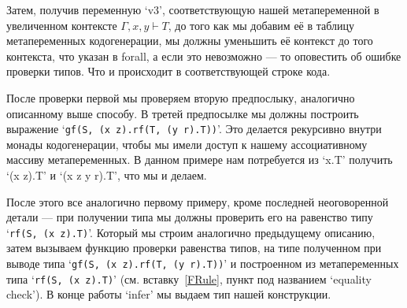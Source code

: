 Затем, получив переменную `v3', соответствующую нашей метапеременной в увеличенном контексте $\Gamma, x, y \vdash T$, до того как мы добавим её в таблицу метапеременных кодогенерации, мы должны уменьшить её контекст до того контекста, что указан в forall, а если это невозможно --- то оповестить об ошибке проверки типов. Что и происходит в соответствующей строке кода.

После проверки первой мы проверяем вторую предпослыку, аналогично описанному выше способу. В третей предпосылке мы должны построить выражение `\lstinline{gf(S, (x z).rf(T, (y r).T))}'. Это делается рекурсивно внутри монады кодогенерации, чтобы мы имели доступ к нашему ассоциативному массиву метапеременных. В данном примере нам потребуется из `x.T' получить `(x z).T' и `(x z y r).T', что мы и делаем.

После этого все аналогично первому примеру, кроме последней неоговоренной детали --- при получении типа мы должны проверить его на равенство типу  `\lstinline{rf(S, (x z).T)}'. Который мы строим аналогично предыдущему описанию, затем вызываем функцию проверки равенства типов, на типе полученном при выводе типа `\lstinline{gf(S, (x z).rf(T, (y r).T))}' и построенном из метапеременных типа `\lstinline{rf(S, (x z).T)}' (см. вставку~\ref{FRule}, пункт под названием `equality check'). В конце работы `infer' мы выдаем тип нашей конструкции.

